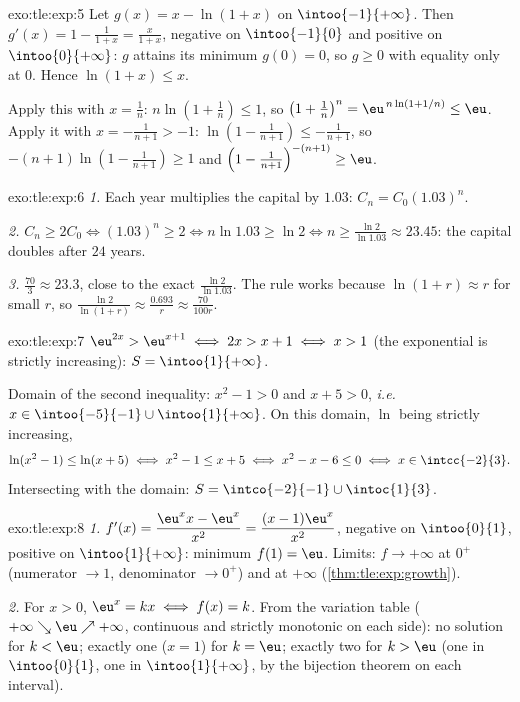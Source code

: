 \begin{solution}{exo:tle:exp:5}
Let $g(x) = x - \ln(1+x)$ on $\intoo{-1}{+\infty}$. Then
$g'(x) = 1 - \frac{1}{1+x} = \frac{x}{1+x}$, negative on $\intoo{-1}{0}$ and
positive on $\intoo{0}{+\infty}$: $g$ attains its minimum $g(0) = 0$, so
$g \geq 0$ with equality only at $0$. Hence $\ln(1+x) \leq x$.

Apply this with $x = \frac1n$:
$n\ln\left(1 + \frac1n\right) \leq 1$, so
$\left(1+\frac1n\right)^n = \eu^{\,n\ln(1+1/n)} \leq \eu$.
Apply it with $x = -\frac{1}{n+1} > -1$:
$\ln\left(1 - \frac{1}{n+1}\right) \leq -\frac{1}{n+1}$, so
$-(n+1)\ln\left(1 - \frac{1}{n+1}\right) \geq 1$ and
$\left(1 - \frac{1}{n+1}\right)^{-(n+1)} \geq \eu$.
\end{solution}

\begin{solution}{exo:tle:exp:6}
\emph{1.} Each year multiplies the capital by $1.03$: $C_n = C_0 (1.03)^n$.

\emph{2.} $C_n \geq 2C_0 \iff (1.03)^n \geq 2 \iff n \ln 1.03 \geq \ln 2
\iff n \geq \frac{\ln 2}{\ln 1.03} \approx 23.45$: the capital doubles after
$24$ years.

\emph{3.} $\frac{70}{3} \approx 23.3$, close to the exact
$\frac{\ln 2}{\ln 1.03}$. The rule works because
$\ln(1 + r) \approx r$ for small $r$, so
$\frac{\ln 2}{\ln(1+r)} \approx \frac{0.693}{r} \approx \frac{70}{100r}$.
\end{solution}

\begin{solution}{exo:tle:exp:7}
$\eu^{2x} > \eu^{x+1} \iff 2x > x + 1 \iff x > 1$ (the exponential is
strictly increasing): $S = \intoo{1}{+\infty}$.

Domain of the second inequality: $x^2 - 1 > 0$ and $x + 5 > 0$, \emph{i.e.}
$x \in \intoo{-5}{-1} \cup \intoo{1}{+\infty}$. On this domain, $\ln$ being
strictly increasing,
\[
\ln(x^2-1) \leq \ln(x+5) \iff x^2 - 1 \leq x + 5 \iff x^2 - x - 6 \leq 0
\iff x \in \intcc{-2}{3}.
\]
Intersecting with the domain: $S = \intco{-2}{-1} \cup \intoc{1}{3}$.
\end{solution}

\begin{solution}{exo:tle:exp:8}
\emph{1.} $f'(x) = \dfrac{\eu^x x - \eu^x}{x^2} = \dfrac{(x-1)\eu^x}{x^2}$,
negative on $\intoo{0}{1}$, positive on $\intoo{1}{+\infty}$: minimum
$f(1) = \eu$. Limits: $f \to +\infty$ at $0^+$ (numerator $\to 1$,
denominator $\to 0^+$) and at $+\infty$ (\cref{thm:tle:exp:growth}).

\emph{2.} For $x > 0$, $\eu^x = kx \iff f(x) = k$. From the variation table
($+\infty \searrow \eu \nearrow +\infty$, continuous and strictly monotonic
on each side): no solution for $k < \eu$; exactly one ($x = 1$) for
$k = \eu$; exactly two for $k > \eu$ (one in $\intoo{0}{1}$, one in
$\intoo{1}{+\infty}$, by the bijection theorem on each interval).
\end{solution}

